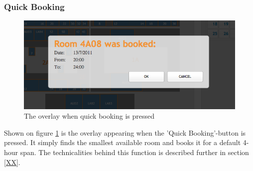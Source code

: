\subsubsection*{Quick Booking}
\begin{figure}[htb]
\begin{center}
\leavevmode
\includegraphics[width=1\textwidth]{images/screens/quick_booking}
\end{center}
\caption{The overlay when quick booking is pressed}
\label{fig:quick_overlay}
\end{figure}
Shown on figure \ref{fig:quick_overlay} is the overlay appearing when the 'Quick Booking'-button is pressed.
It simply finds the smallest available room and books it for a default 4-hour span. The technicalities behind this function is described further in section \ref{XX}.

\pagebreak
